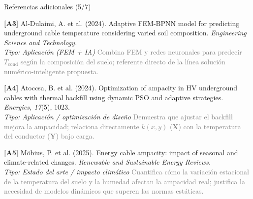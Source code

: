 \documentclass[aspectratio=169]{beamer}
\begin{document}
\begin{frame}{Referencias adicionales (5/7)}
\small\justifying

\textbf{[A3]} Al-Dulaimi, A. et al. (2024). Adaptive FEM-BPNN model for
predicting underground cable temperature considering varied soil composition.
\textit{Engineering Science and Technology.}\\
\textcolor{purple!70!black}{\footnotesize\textit{Tipo: Aplicación (FEM + IA)}} \quad
\textcolor{gray}{\footnotesize Combina FEM y redes neuronales para predecir
$T_{\text{cond}}$ según la composición del suelo; referente directo de la
línea solución numérico-inteligente propuesta.}

\medskip
\textbf{[A4]} Atoccsa, B. et al. (2024). Optimization of ampacity in HV
underground cables with thermal backfill using dynamic PSO and adaptive
strategies. \textit{Energies, 17}(5), 1023.\\
\textcolor{purple!70!black}{\footnotesize\textit{Tipo: Aplicación / optimización de diseño}} \quad
\textcolor{gray}{\footnotesize Demuestra que ajustar el backfill mejora la
ampacidad; relaciona directamente $k(x,y)$ (\textbf{X}) con la temperatura
del conductor (\textbf{Y}) bajo carga.}

\medskip
\textbf{[A5]} Möbius, P. et al. (2025). Energy cable ampacity: impact of
seasonal and climate-related changes. \textit{Renewable and Sustainable Energy
Reviews.}\\
\textcolor{purple!70!black}{\footnotesize\textit{Tipo: Estado del arte / impacto climático}} \quad
\textcolor{gray}{\footnotesize Cuantifica cómo la variación estacional de la
temperatura del suelo y la humedad afectan la ampacidad real; justifica la
necesidad de modelos dinámicos que superen las normas estáticas.}
\end{frame}
\end{document}

